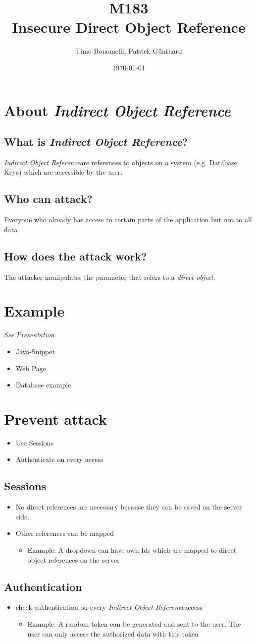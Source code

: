 \documentclass[a4paper]{article}
\title{\textbf{M183}\\Insecure Direct Object Reference}
\author{Timo Bonomelli, Patrick Günthard}
\date{\today}
\newcommand{\idor}{\textit{Indirect Object Reference}}
\begin{document}
\maketitle
\section{About \idor}
\subsection{What is \idor?}
\idor are references to objects on a system (e.g. Database Keys) which are accessible by the user.
\subsection{Who can attack?}
Everyone who already has access to certain parts of the application but not to all data
\subsection{How does the attack work?}
The attacker manipulates the parameter that refers to a \textit{direct object}.

\section{Example}
\textit{See Presentation}
\begin{itemize}
  \item Java-Snippet
  \item Web Page
  \item Database example
\end{itemize} 
\section{Prevent attack}
\begin{itemize}
  \item Use Sessions 
  \item Authenticate on every access
\end{itemize}
\subsection{Sessions}
\begin{itemize}
\item No direct references are necessary because they can be saved on the server side.
\item Other references can be mapped
  \begin{itemize}
  \item Example: A dropdown can have own Ids which are mapped to direct object references on the server
  \end{itemize}  
\end{itemize}
\subsection{Authentication}
\begin{itemize}
\item check authentication on every \idor access
  \begin{itemize}
    \item Example: A random token can be generated and sent to the user. The user can only access the authorized data with this token
  \end{itemize}
\end{itemize}
\end{document}
